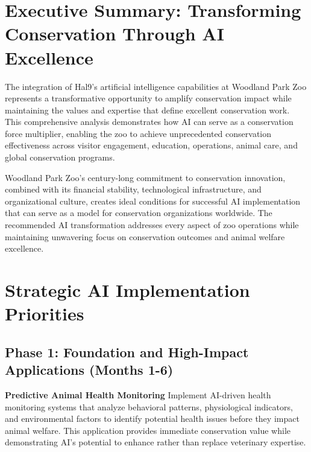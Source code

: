\documentclass[
  Letterpaper,
]{scrbook}
\begin{document}

\section*{Executive Summary: Transforming Conservation Through AI
Excellence}\label{executive-summary-transforming-conservation-through-ai-excellence}


The integration of Hal9's artificial intelligence capabilities at
Woodland Park Zoo represents a transformative opportunity to amplify
conservation impact while maintaining the values and expertise that
define excellent conservation work. This comprehensive analysis
demonstrates how AI can serve as a conservation force multiplier,
enabling the zoo to achieve unprecedented conservation effectiveness
across visitor engagement, education, operations, animal care, and
global conservation programs.

Woodland Park Zoo's century-long commitment to conservation innovation,
combined with its financial stability, technological infrastructure, and
organizational culture, creates ideal conditions for successful AI
implementation that can serve as a model for conservation organizations
worldwide. The recommended AI transformation addresses every aspect of
zoo operations while maintaining unwavering focus on conservation
outcomes and animal welfare excellence.

\section*{Strategic AI Implementation
Priorities}\label{strategic-ai-implementation-priorities}


\subsection*{Phase 1: Foundation and High-Impact Applications (Months
1-6)}\label{phase-1-foundation-and-high-impact-applications-months-1-6}

\textbf{Predictive Animal Health Monitoring} Implement AI-driven health
monitoring systems that analyze behavioral patterns, physiological
indicators, and environmental factors to identify potential health
issues before they impact animal welfare. This application provides
immediate conservation value while demonstrating AI's potential to
enhance rather than replace veterinary expertise.
\end{document}
